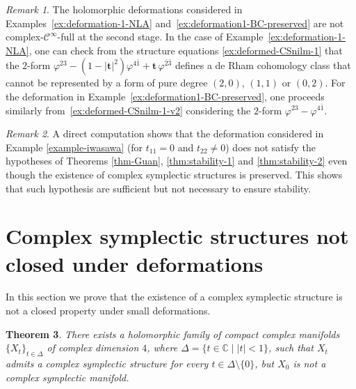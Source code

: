 \documentclass[a4paper]{amsart}
\newtheorem{theorem}{Theorem}[section]
\theoremstyle{definition}
\theoremstyle{remark}
\newtheorem{remark}[theorem]{Remark}
\numberwithin{equation}{section}
\begin{document}

\begin{remark}
The holomorphic deformations considered in Examples~\ref{ex:deformation-1-NLA} and~\ref{ex:deformation1-BC-preserved} are not complex-$\mathcal C^\infty$-full at the second stage. In the case of Example~\ref{ex:deformation-1-NLA}, one can check from the structure equations \eqref{ex:deformed-CSnilm-1} that the
$2$-form $\varphi^{23}-(1-\left|\mathbf t\right|^2)\varphi^{4\bar1}+{\mathbf t}\,\varphi^{\bar2\bar3}$ defines a de Rham cohomology class that cannot be represented by a form of pure degree $(2,0)$, $(1,1)$ or $(0,2)$. For the deformation in Example~\ref{ex:deformation1-BC-preserved}, one proceeds similarly from~\eqref{ex:deformed-CSnilm-1-v2} considering the $2$-form $\varphi^{23}-\varphi^{4\bar1}$.
\end{remark}


\begin{remark}
A direct computation shows that the deformation considered in Example \ref{example-iwasawa} (for $t_{11}=0$ and $t_{22}\neq 0$) does not satisfy the hypotheses of Theorems \ref{thm-Guan}, \ref{thm:stability-1} and \ref{thm:stability-2} even though the existence of complex symplectic structures is preserved. This shows that such hypothesis are sufficient but not necessary to ensure stability. 
\end{remark}


\section{Complex symplectic structures  not closed under deformations}\label{non-closed}


In this section we prove that the existence of a complex symplectic structure is not a closed property under small deformations. 

\begin{theorem}\label{hs-no-cerrada}
There exists a holomorphic family of compact complex manifolds $\{X_{t}\}_{t\in\Delta}$ of complex
dimension $4$, where $\Delta=\{t\in\mathbb C\mid |t|<1\}$, such that $X_{t}$ admits a complex
symplectic structure for every $t\in\Delta\setminus\{0\}$, but $X_{0}$ is not a complex symplectic manifold.
\end{theorem}
\end{document}
